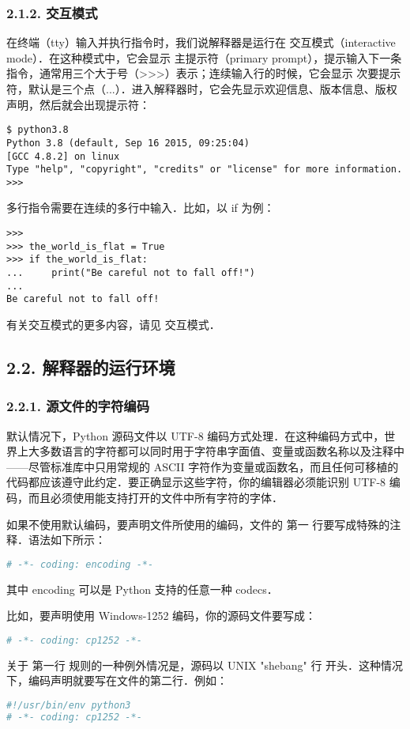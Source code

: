 \subsubsection{2.1.2. 交互模式}

在终端（tty）输入并执行指令时，我们说解释器是运行在 交互模式（interactive mode）．在这种模式中，它会显示 主提示符（primary prompt），提示输入下一条指令，通常用三个大于号（>>>）表示；连续输入行的时候，它会显示 次要提示符，默认是三个点（...）．进入解释器时，它会先显示欢迎信息、版本信息、版权声明，然后就会出现提示符：

\begin{lstlisting}[language=pythonC]
$ python3.8
Python 3.8 (default, Sep 16 2015, 09:25:04)
[GCC 4.8.2] on linux
Type "help", "copyright", "credits" or "license" for more information.
>>>
\end{lstlisting}
多行指令需要在连续的多行中输入．比如，以 if 为例：
\begin{lstlisting}[language=pythonC]
>>>
>>> the_world_is_flat = True
>>> if the_world_is_flat:
...     print("Be careful not to fall off!")
...
Be careful not to fall off!
\end{lstlisting}
有关交互模式的更多内容，请见 交互模式．

\subsection{2.2. 解释器的运行环境}

\subsubsection{2.2.1. 源文件的字符编码}

默认情况下，Python 源码文件以 UTF-8 编码方式处理．在这种编码方式中，世界上大多数语言的字符都可以同时用于字符串字面值、变量或函数名称以及注释中——尽管标准库中只用常规的 ASCII 字符作为变量或函数名，而且任何可移植的代码都应该遵守此约定．要正确显示这些字符，你的编辑器必须能识别 UTF-8 编码，而且必须使用能支持打开的文件中所有字符的字体．

如果不使用默认编码，要声明文件所使用的编码，文件的 第一 行要写成特殊的注释．语法如下所示：

\begin{lstlisting}[language=python]
# -*- coding: encoding -*-
\end{lstlisting}
其中 encoding 可以是 Python 支持的任意一种 codecs．

比如，要声明使用 Windows-1252 编码，你的源码文件要写成：

\begin{lstlisting}[language=python]
# -*- coding: cp1252 -*-
\end{lstlisting}
关于 第一行 规则的一种例外情况是，源码以 UNIX "shebang" 行 开头．这种情况下，编码声明就要写在文件的第二行．例如：

\begin{lstlisting}[language=python]
#!/usr/bin/env python3
# -*- coding: cp1252 -*-
\end{lstlisting}


